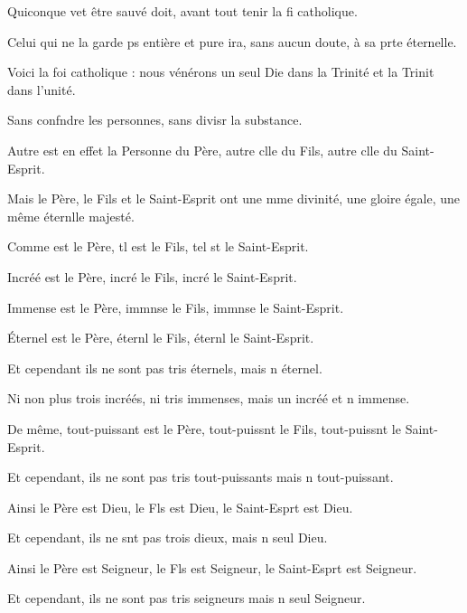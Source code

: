 \item Quiconque vet être sauvé\psstar{} doit, avant tout tenir la fi catholique.
\item Celui qui ne la garde ps entière et pure\psstar{} ira, sans aucun doute, à sa prte éternelle.
\item Voici la foi catholique :\pscross{} nous vénérons un seul Die dans la Trinité\psstar{} et la Trinit dans l’unité.
\item Sans confndre les personnes,\psstar{} sans divisr la substance.
\item Autre est en effet la Personne du Père,\pscross{} autre clle du Fils,\psstar{} autre clle du Saint-Esprit.
\item Mais le Père, le Fils et le Saint-Esprit ont une mme divinité,\psstar{} une gloire égale, une même éternlle majesté.
\item Comme est le Père, tl est le Fils,\psstar{} tel st le Saint-Esprit.
\item Incréé est le Père, incré le Fils,\psstar{} incré le Saint-Esprit.
\item Immense est le Père, immnse le Fils,\psstar{} immnse le Saint-Esprit.
\item Éternel est le Père, éternl le Fils,\psstar{} éternl le Saint-Esprit.
\item Et cependant ils ne sont pas tris éternels,\psstar{} mais n éternel.
\item Ni non plus trois incréés, ni tris immenses,\psstar{} mais un incréé et n immense.
\item De même, tout-puissant est le Père, tout-puissnt le Fils,\psstar{} tout-puissnt le Saint-Esprit.
\item Et cependant, ils ne sont pas tris tout-puissants\psstar{} mais n tout-puissant.
\item Ainsi le Père est Dieu, le Fls est Dieu,\psstar{} le Saint-Esprt est Dieu.
\item Et cependant, ils ne snt pas trois dieux,\psstar{} mais n seul Dieu.
\item Ainsi le Père est Seigneur, le Fls est Seigneur,\psstar{} le Saint-Esprt est Seigneur.
\item Et cependant, ils ne sont pas tris seigneurs\psstar{} mais n seul Seigneur.
